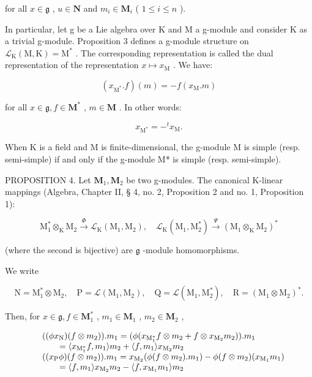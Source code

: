 for all \(x \in \mathfrak{g}\) , \(u \in \mathbf{N}\) and \(m_i \in \mathbf{M}_i\) ( \(1 \leqslant i \leqslant n\) ).

In particular, let g be a Lie algebra over K and M a g-module and consider K as a trivial g-module. Proposition 3 defines a g-module structure on \(\mathcal{L}_{\mathrm{K}}(\mathrm{M},\mathrm{K}) = \mathrm{M}^{*}\) . The corresponding representation is called the dual representation of the representation \(x\mapsto x_{\mathrm{M}}\) . We have:

\[
(x _ {\mathrm{M} ^ {*}}. f) (m) = - f (x _ {\mathrm{M}}. m)\tag{8}
\]

for all \(x \in \mathfrak{g}, f \in \mathbf{M}^*\) , \(m \in \mathbf{M}\) . In other words:

\[
x _ {\mathrm{M} ^ {*}} = - ^ {t} x _ {\mathrm{M}}.\tag{9}
\]

When K is a field and M is finite-dimensional, the g-module M is simple (resp. semi-simple) if and only if the g-module M* is simple (resp. semi-simple).

PROPOSITION 4. Let \(\mathbf{M}_1, \mathbf{M}_2\) be two g-modules. The canonical K-linear mappings (Algebra, Chapter II, § 4, no. 2, Proposition 2 and no. 1, Proposition 1):

\[
\mathrm{M} _ {1} ^ {*} \otimes_ {\mathrm{K}} \mathrm{M} _ {2} \xrightarrow {\Phi} \mathscr {L} _ {\mathrm{K}} (\mathrm{M} _ {1}, \mathrm{M} _ {2}), \quad \mathscr {L} _ {\mathrm{K}} (\mathrm{M} _ {1}, \mathrm{M} _ {2} ^ {*}) \xrightarrow {\Psi} (\mathrm{M} _ {1} \otimes_ {\mathrm{K}} \mathrm{M} _ {2}) ^ {*}
\]

(where the second is bijective) are \(\mathfrak{g}\) -module homomorphisms.

We write

\[
\mathrm{N} = \mathrm{M} _ {1} ^ {*} \otimes \mathrm{M} _ {2}, \quad \mathrm{P} = \mathscr {L} (\mathrm{M} _ {1}, \mathrm{M} _ {2}), \quad \mathrm{Q} = \mathscr {L} (\mathrm{M} _ {1}, \mathrm{M} _ {2} ^ {*}), \quad \mathrm{R} = (\mathrm{M} _ {1} \otimes \mathrm{M} _ {2}) ^ {*}.
\]

Then, for \(x \in \mathfrak{g}, f \in \mathbf{M}_1^*\) , \(m_1 \in \mathbf{M}_1\) , \(m_2 \in \mathbf{M}_2\) ,

\[
\begin{array}{r l} & {((\phi x _ {\mathrm{N}}) (f \otimes m _ {2})). m _ {1} = (\phi (x _ {\mathrm{M} _ {1} ^ {*}} f \otimes m _ {2} + f \otimes x _ {\mathrm{M} _ {2}} m _ {2})). m _ {1}} \\ & {\qquad = \langle x _ {\mathrm{M} _ {1} ^ {*}} f, m _ {1} \rangle m _ {2} + \langle f, m _ {1} \rangle x _ {\mathrm{M} _ {2}} m _ {2}} \\ & {((x _ {\mathrm{P}} \phi) (f \otimes m _ {2})). m _ {1} = x _ {\mathrm{M} _ {2}} (\phi (f \otimes m _ {2}). m _ {1}) - \phi (f \otimes m _ {2}) (x _ {\mathrm{M} _ {1}} m _ {1})} \\ & {\qquad = \langle f, m _ {1} \rangle x _ {\mathrm{M} _ {2}} m _ {2} - \langle f, x _ {\mathrm{M} _ {1}} m _ {1} \rangle m _ {2}} \end{array}
\]


